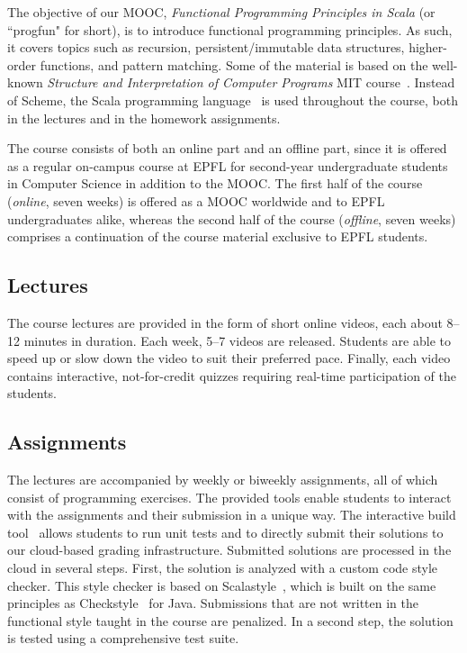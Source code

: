 \documentclass{sig-alternate}
\begin{document}
The objective of our MOOC, {\em Functional Programming Principles in Scala} (or ``progfun" for short),
is to introduce functional programming
principles. As such, it covers topics such as recursion, persistent/immutable data
structures, higher-order functions, and pattern matching. Some of the material
is based on the well-known {\em Structure and Interpretation of Computer
Programs} MIT course~\cite{Abelson85}. Instead of Scheme, the Scala
programming language~\cite{Odersky-Spoon-Venners07} is used throughout the
course, both in the lectures and in the homework assignments.

The course consists of both an online part and an offline part, since it is
offered as a regular on-campus course at EPFL for second-year undergraduate
students in Computer Science in addition to the MOOC. The first half of the course ({\em online}, seven weeks) is offered as a MOOC worldwide and to EPFL undergraduates alike, whereas the second half of the course ({\em offline}, seven weeks) comprises a continuation of the course material exclusive to EPFL students.

\subsection{Lectures}\label{sec:mooc-elements}

The course lectures are provided in the form of short
online videos, each about 8--12 minutes in duration. Each week, 5--7
videos are released.
Students are able to speed up or slow down the video to suit their preferred pace. Finally, each video contains interactive, not-for-credit
quizzes requiring real-time participation of the students.

\subsection{Assignments}

The lectures are accompanied by weekly or biweekly assignments, all of which
consist of programming exercises. The provided tools enable students to
interact with the assignments and their submission in a unique way. The
interactive build tool~\cite{sbt} allows students to run unit tests and to
directly submit their solutions to our cloud-based grading infrastructure.
Submitted solutions are processed in the cloud in several steps. First, the
solution is analyzed with a custom code style checker. This style checker is based
on Scalastyle~\cite{ScalaStyle}, which is built on the same principles as
Checkstyle~\cite{Ware08} for Java. Submissions that are not written in the
functional style taught in the course are penalized. In a second step,
the solution is tested using a comprehensive test suite.
\end{document}
